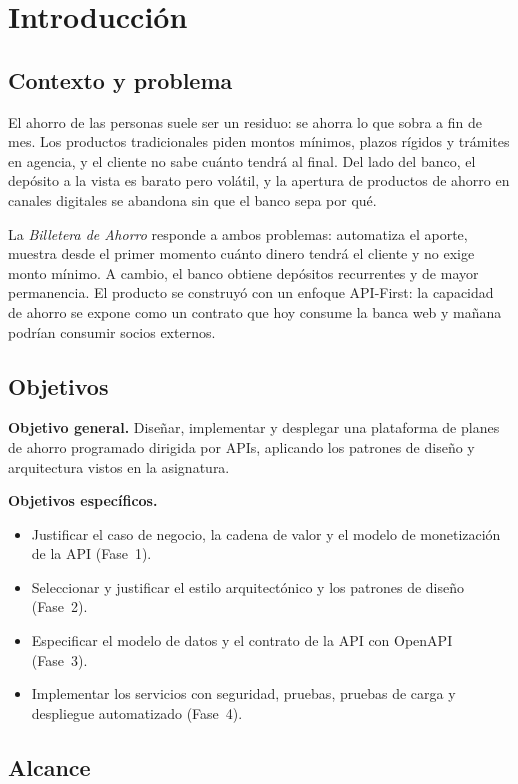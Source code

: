 \chapter{Introducción}\label{cap:introduccion}

\section{Contexto y problema}

El ahorro de las personas suele ser un residuo: se ahorra lo que sobra a fin de mes. Los productos tradicionales piden montos mínimos, plazos rígidos y trámites en agencia, y el cliente no sabe cuánto tendrá al final. Del lado del banco, el depósito a la vista es barato pero volátil, y la apertura de productos de ahorro en canales digitales se abandona sin que el banco sepa por qué.

La \emph{Billetera de Ahorro} responde a ambos problemas: automatiza el aporte, muestra desde el primer momento cuánto dinero tendrá el cliente y no exige monto mínimo. A cambio, el banco obtiene depósitos recurrentes y de mayor permanencia. El producto se construyó con un enfoque API-First: la capacidad de ahorro se expone como un contrato que hoy consume la banca web y mañana podrían consumir socios externos.

\section{Objetivos}

\textbf{Objetivo general.} Diseñar, implementar y desplegar una plataforma de planes de ahorro programado dirigida por APIs, aplicando los patrones de diseño y arquitectura vistos en la asignatura.

\textbf{Objetivos específicos.}
\begin{itemize}
  \item Justificar el caso de negocio, la cadena de valor y el modelo de monetización de la API (Fase~1).
  \item Seleccionar y justificar el estilo arquitectónico y los patrones de diseño (Fase~2).
  \item Especificar el modelo de datos y el contrato de la API con OpenAPI (Fase~3).
  \item Implementar los servicios con seguridad, pruebas, pruebas de carga y despliegue automatizado (Fase~4).
\end{itemize}

\section{Alcance}

